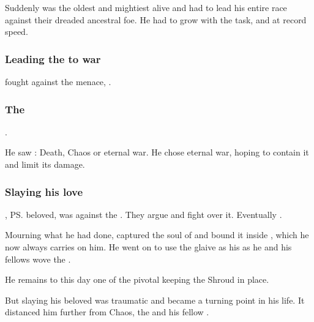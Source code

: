 Suddenly \Ishnaruchaefir was the oldest and mightiest \dragon alive and had to lead his entire race against their dreaded ancestral foe. 
He had to grow with the task, and at record speed. 






\subsubsection{Leading the \dragons{} to war}
\Ishnaruchaefir{} fought against the \resphan{} menace, .







\subsubsection{The \SecondShrouding}
\Ishnaruchaefir{} . 

He saw : 
Death, Chaos or eternal war. 
He chose eternal war, hoping to contain it and limit its damage. 







\subsubsection{Slaying his love}
\Triestessakhin, \ps{\Ishnaruchaefir} beloved, was against the \SecondShrouding{}. 
They argue and fight over it. 
Eventually . 

Mourning what he had done, \Ishnaruchaefir{} captured the soul of \Triestessakhin{} and bound it inside , which he now always carries on him. 
He went on to use the glaive as his  as he and his fellows wove the . 

He remains to this day one of the pivotal \vertices{} keeping the Shroud in place.

But slaying his beloved was traumatic and became a turning point in his life. It distanced him further from Chaos, the \firstgendragons{} and his fellow \dragons.





